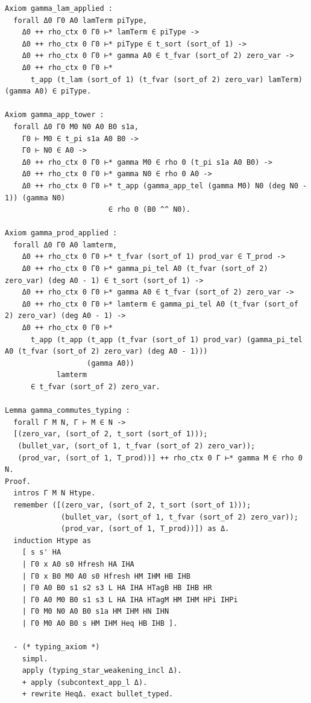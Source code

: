 \begin{latin}
\begin{verbatim}
Axiom gamma_lam_applied :
  forall Δ0 Γ0 A0 lamTerm piType,
    Δ0 ++ rho_ctx 0 Γ0 ⊢* lamTerm ∈ piType ->
    Δ0 ++ rho_ctx 0 Γ0 ⊢* piType ∈ t_sort (sort_of 1) ->
    Δ0 ++ rho_ctx 0 Γ0 ⊢* gamma A0 ∈ t_fvar (sort_of 2) zero_var ->
    Δ0 ++ rho_ctx 0 Γ0 ⊢*
      t_app (t_lam (sort_of 1) (t_fvar (sort_of 2) zero_var) lamTerm) (gamma A0) ∈ piType.

Axiom gamma_app_tower :
  forall Δ0 Γ0 M0 N0 A0 B0 s1a,
    Γ0 ⊢ M0 ∈ t_pi s1a A0 B0 ->
    Γ0 ⊢ N0 ∈ A0 ->
    Δ0 ++ rho_ctx 0 Γ0 ⊢* gamma M0 ∈ rho 0 (t_pi s1a A0 B0) ->
    Δ0 ++ rho_ctx 0 Γ0 ⊢* gamma N0 ∈ rho 0 A0 ->
    Δ0 ++ rho_ctx 0 Γ0 ⊢* t_app (gamma_app_tel (gamma M0) N0 (deg N0 - 1)) (gamma N0)
                        ∈ rho 0 (B0 ^^ N0).

Axiom gamma_prod_applied :
  forall Δ0 Γ0 A0 lamterm,
    Δ0 ++ rho_ctx 0 Γ0 ⊢* t_fvar (sort_of 1) prod_var ∈ T_prod ->
    Δ0 ++ rho_ctx 0 Γ0 ⊢* gamma_pi_tel A0 (t_fvar (sort_of 2) zero_var) (deg A0 - 1) ∈ t_sort (sort_of 1) ->
    Δ0 ++ rho_ctx 0 Γ0 ⊢* gamma A0 ∈ t_fvar (sort_of 2) zero_var ->
    Δ0 ++ rho_ctx 0 Γ0 ⊢* lamterm ∈ gamma_pi_tel A0 (t_fvar (sort_of 2) zero_var) (deg A0 - 1) ->
    Δ0 ++ rho_ctx 0 Γ0 ⊢*
      t_app (t_app (t_app (t_fvar (sort_of 1) prod_var) (gamma_pi_tel A0 (t_fvar (sort_of 2) zero_var) (deg A0 - 1)))
                   (gamma A0))
            lamterm
      ∈ t_fvar (sort_of 2) zero_var.

Lemma gamma_commutes_typing :
  forall Γ M N, Γ ⊢ M ∈ N ->
  [(zero_var, (sort_of 2, t_sort (sort_of 1)));
   (bullet_var, (sort_of 1, t_fvar (sort_of 2) zero_var));
   (prod_var, (sort_of 1, T_prod))] ++ rho_ctx 0 Γ ⊢* gamma M ∈ rho 0 N.
Proof.
  intros Γ M N Htype.
  remember ([(zero_var, (sort_of 2, t_sort (sort_of 1)));
             (bullet_var, (sort_of 1, t_fvar (sort_of 2) zero_var));
             (prod_var, (sort_of 1, T_prod))]) as Δ.
  induction Htype as
    [ s s' HA
    | Γ0 x A0 s0 Hfresh HA IHA
    | Γ0 x B0 M0 A0 s0 Hfresh HM IHM HB IHB
    | Γ0 A0 B0 s1 s2 s3 L HA IHA HTagB HB IHB HR
    | Γ0 A0 M0 B0 s1 s3 L HA IHA HTagM HM IHM HPi IHPi
    | Γ0 M0 N0 A0 B0 s1a HM IHM HN IHN
    | Γ0 M0 A0 B0 s HM IHM Heq HB IHB ].

  - (* typing_axiom *)
    simpl.
    apply (typing_star_weakening_incl Δ).
    + apply (subcontext_app_l Δ).
    + rewrite HeqΔ. exact bullet_typed.


\end{verbatim}
\end{latin}
